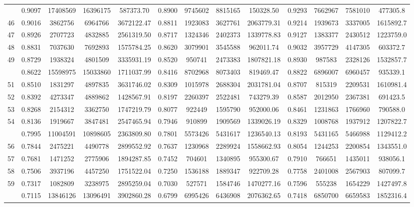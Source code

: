 \documentclass[
  12pt,
]{article}
\begin{document}
\begin{longtable}[t]{lcccccccccccc}
\addlinespace
45 & 0.9097 & 17408569 & 16396175 & 587373.70 & 0.8900 & 9745602 & 8815165 & 150328.50 & 0.9293 & 7662967 & 7581010 & 477305.8\\
46 & 0.9016 & 3862756 & 6964766 & 3672122.47 & 0.8811 & 1923083 & 3627761 & 2063779.31 & 0.9214 & 1939673 & 3337005 & 1615892.7\\
47 & 0.8926 & 2707723 & 4832885 & 2561319.50 & 0.8717 & 1324346 & 2402373 & 1339778.83 & 0.9127 & 1383377 & 2430512 & 1223759.0\\
48 & 0.8831 & 7037630 & 7692893 & 1575784.25 & 0.8620 & 3079901 & 3545588 & 962011.74 & 0.9032 & 3957729 & 4147305 & 603372.7\\
49 & 0.8729 & 1938324 & 4801509 & 3335931.19 & 0.8520 & 950741 & 2473383 & 1807821.18 & 0.8930 & 987583 & 2328126 & 1532857.7\\
\addlinespace
50 & 0.8622 & 15598975 & 15033860 & 1711037.99 & 0.8416 & 8702968 & 8073403 & 819469.47 & 0.8822 & 6896007 & 6960457 & 935339.1\\
51 & 0.8510 & 1831297 & 4897835 & 3631746.02 & 0.8309 & 1015978 & 2688304 & 2031781.04 & 0.8707 & 815319 & 2209531 & 1610981.4\\
52 & 0.8392 & 4273347 & 4889862 & 1428567.91 & 0.8197 & 2260397 & 2522481 & 743279.39 & 0.8587 & 2012950 & 2367381 & 691423.5\\
53 & 0.8268 & 2154312 & 3362750 & 1747219.79 & 0.8077 & 922449 & 1595790 & 952000.06 & 0.8461 & 1231863 & 1766960 & 790588.0\\
54 & 0.8136 & 1919667 & 3847481 & 2547465.94 & 0.7946 & 910899 & 1909569 & 1339026.19 & 0.8329 & 1008768 & 1937912 & 1207822.7\\
\addlinespace
55 & 0.7995 & 11004591 & 10898605 & 2363809.80 & 0.7801 & 5573426 & 5431617 & 1236540.13 & 0.8193 & 5431165 & 5466988 & 1129412.2\\
56 & 0.7844 & 2475221 & 4490778 & 2899552.92 & 0.7637 & 1230968 & 2289924 & 1558662.93 & 0.8054 & 1244253 & 2200854 & 1343551.0\\
57 & 0.7681 & 1471252 & 2775906 & 1894287.85 & 0.7452 & 704601 & 1340895 & 955300.67 & 0.7910 & 766651 & 1435011 & 938056.1\\
58 & 0.7506 & 3937196 & 4457250 & 1751522.04 & 0.7250 & 1536188 & 1889347 & 922709.28 & 0.7758 & 2401008 & 2567903 & 807099.7\\
59 & 0.7317 & 1082809 & 3238975 & 2895259.04 & 0.7030 & 527571 & 1584746 & 1470277.16 & 0.7596 & 555238 & 1654229 & 1427497.8\\
\addlinespace
60 & 0.7115 & 13846126 & 13096491 & 3902860.28 & 0.6799 & 6995426 & 6436908 & 2076362.65 & 0.7418 & 6850700 & 6659583 & 1852316.4\\

\end{longtable}
\end{document}
